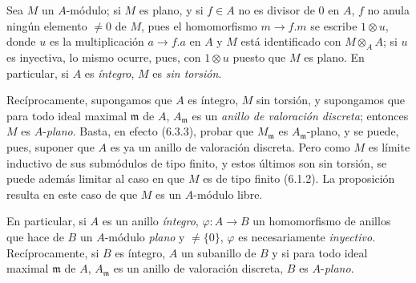 \begin{env}[6.3.4]
\label{0.6.3.4-fr}
Sea $M$ un $A$-módulo; si $M$ es plano, y si $f\in A$ no es divisor
de $0$ en $A$, $f$ no anula ningún elemento $\neq0$ de $M$, pues
el homomorfismo $m\to f.m$ se escribe $1\otimes u$, donde $u$ es la
multiplicación $a\to f.a$ en $A$ y $M$ está identificado con
$M\otimes_A A$; si $u$ es inyectiva, lo mismo ocurre, pues, con
$1\otimes u$ puesto que $M$ es plano. En particular, si $A$ es
\emph{íntegro}, $M$ es \emph{sin torsión}.

Recíprocamente, supongamos que $A$ es íntegro, $M$ sin torsión, y supongamos que para
todo ideal maximal $\mathfrak{m}$ de $A$, $A_\mathfrak{m}$ es un
\emph{anillo de valoración discreta}; entonces $M$ es $A$-\emph{plano}. Basta, en
efecto (6.3.3), probar que $M_\mathfrak{m}$ es $A_\mathfrak{m}$-plano, y
se puede, pues, suponer que $A$ es ya un anillo de valoración discreta. Pero
como $M$ es límite inductivo de sus submódulos de tipo finito, y estos
últimos son sin torsión, se puede además limitar al caso en que $M$ es de
tipo finito (6.1.2). La proposición resulta en este caso de que $M$ es un
$A$-módulo libre.

En particular, si $A$ es un anillo \emph{íntegro},
$\varphi:A\to B$ un homomorfismo de anillos que hace de $B$ un $A$-módulo
\emph{plano} y $\neq\{0\}$, $\varphi$ es necesariamente \emph{inyectivo}.
Recíprocamente, si $B$ es íntegro, $A$ un subanillo de $B$ y si para todo
ideal maximal $\mathfrak{m}$ de $A$, $A_\mathfrak{m}$ es un anillo de
valoración discreta, $B$ es $A$-\emph{plano}.
\end{env}

